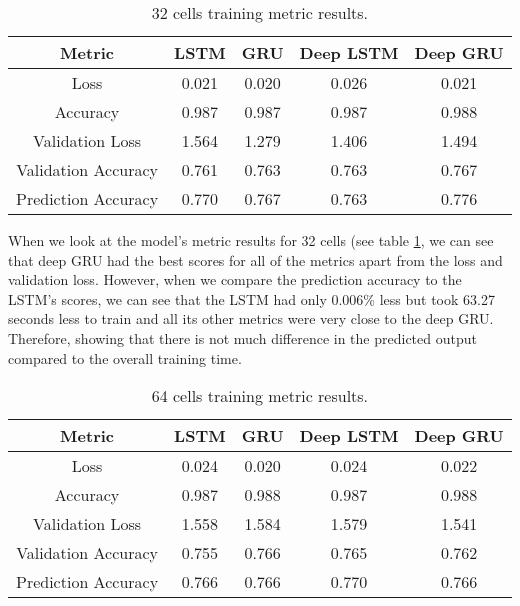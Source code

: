 \documentclass[a4paper,10pt]{article}
\begin{document}
	\begin{table}[ht]
		\centering
		\small
		\begin{tabular}[t]{ | c | c | c | c | c | }
			\hline
			Metric          & LSTM  & GRU   & Deep LSTM & Deep GRU \\ 
			\hline
			Loss            & 0.021 & 0.020 & 0.026     & 0.021 \\ 
			\hline
			Accuracy        & 0.987 & 0.987 & 0.987     & 0.988  \\ 
			\hline
			Validation Loss & 1.564 & 1.279 & 1.406 & 1.494 \\
			\hline
			Validation Accuracy & 0.761 & 0.763 & 0.763 & 0.767 \\
			\hline
			Prediction Accuracy & 0.770     & 0.767 & 0.763     & 0.776 \\
			\hline 
		\end{tabular}
		\caption{32 cells training metric results.}
		\label{tab:32_metrics}
	\end{table}%

	When we look at the model's metric results for 32 cells (see table \ref{tab:32_metrics}, we can see that deep GRU had the best scores for all of the metrics apart from the loss and validation loss. However, when we compare the prediction accuracy to the LSTM's scores, we can see that the LSTM had only 0.006\% less but took 63.27 seconds less to train and all its other metrics were very close to the deep GRU. Therefore, showing that there is not much difference in the predicted output compared to the overall training time.

		\begin{table}[ht]
		\centering
		\small
		\begin{tabular}[t]{ | c | c | c | c | c | }
			\hline
			Metric              & LSTM  & GRU   & Deep LSTM & Deep GRU \\ 
			\hline
			Loss                & 0.024 & 0.020 & 0.024     & 0.022 \\ 
			\hline
			Accuracy            & 0.987 & 0.988 & 0.987     & 0.988  \\ 
			\hline
			Validation Loss     & 1.558 & 1.584 & 1.579     & 1.541 \\
			\hline
			Validation Accuracy & 0.755 & 0.766 & 0.765     & 0.762 \\
			\hline
			Prediction Accuracy & 0.766     & 0.766 & 0.770     & 0.766  \\ 
			\hline
		\end{tabular}
		\caption{64 cells training metric results.}
		\label{tab:64_metrics}
	\end{table}%
	
\end{document}
